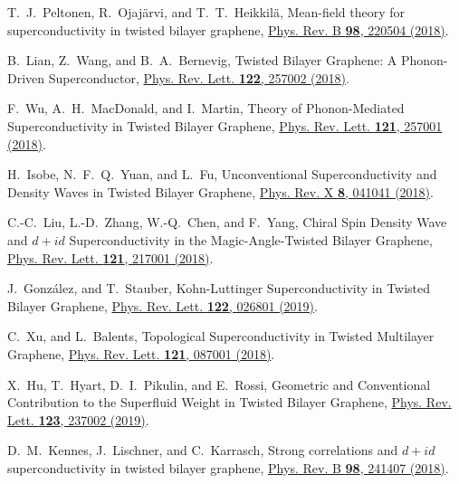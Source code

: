 \documentclass[twocolumn,english,prl,floatfix,citeautoscript,nofootinbib]{revtex4}
\begin{document}
\begin{thebibliography}{999}
 T.~J.~Peltonen, R.~Ojaj\"arvi, and
T.~T.~Heikkil\"a, Mean-field theory for superconductivity in twisted bilayer
graphene, \href{https://doi.org/10.1103/PhysRevB.98.220504}{Phys. Rev. B
\textbf{98}, 220504 (2018)}.

 B.~Lian, Z.~Wang, and B.~A.~Bernevig,
Twisted Bilayer Graphene: A Phonon-Driven Superconductor, \href{https://doi.org/10.1103/PhysRevLett.122.257002}%
{Phys. Rev. Lett. \textbf{122}, 257002 (2018)}.

 F.~Wu, A.~H.~MacDonald, and I.~Martin,
Theory of Phonon-Mediated Superconductivity in Twisted Bilayer Graphene,
\href{https://doi.org/10.1103/PhysRevLett.121.257001}{Phys. Rev. Lett.
\textbf{121}, 257001 (2018)}.

 H.~Isobe, N.~F.~Q.~Yuan, and L.~Fu,
Unconventional Superconductivity and Density Waves in Twisted Bilayer
Graphene, \href{https://doi.org/10.1103/PhysRevX.8.041041}{Phys. Rev. X
\textbf{8}, 041041 (2018)}.

 C.-C.~Liu, L.-D.~Zhang, W.-Q.~Chen, and
F.~Yang, Chiral Spin Density Wave and $d+id$ Superconductivity in the
Magic-Angle-Twisted Bilayer Graphene, \href{https://doi.org/10.1103/PhysRevLett.121.217001}%
{Phys. Rev. Lett. \textbf{121}, 217001 (2018)}.

 J.~Gonz\'alez, and T.~Stauber,
Kohn-Luttinger Superconductivity in Twisted Bilayer Graphene, \href{https://doi.org/10.1103/PhysRevLett.122.026801}%
{Phys. Rev. Lett. \textbf{122}, 026801 (2019)}.

 C.~Xu, and L.~Balents, Topological
Superconductivity in Twisted Multilayer Graphene, \href{https://doi.org/10.1103/PhysRevLett.121.087001}%
{Phys. Rev. Lett. \textbf{121}, 087001 (2018)}.

 X.~Hu, T.~Hyart, D.~I.~Pikulin, and
E.~Rossi, Geometric and Conventional Contribution to the Superfluid Weight
in Twisted Bilayer Graphene, \href{https://doi.org/10.1103/PhysRevLett.123.237002}%
{Phys. Rev. Lett. \textbf{123}, 237002 (2019)}.


 D.~M.~Kennes, J.~Lischner, and C.~Karrasch,
Strong correlations and $d+id$ superconductivity in twisted bilayer
graphene, \href{https://doi.org/10.1103/PhysRevB.98.241407}{Phys. Rev. B
\textbf{98}, 241407 (2018)}.


\end{thebibliography}
\end{document}
